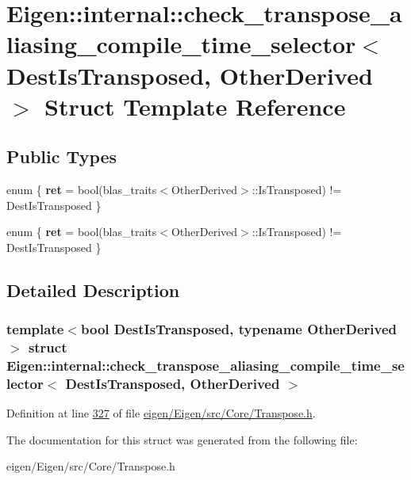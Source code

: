 \hypertarget{struct_eigen_1_1internal_1_1check__transpose__aliasing__compile__time__selector}{}\section{Eigen\+:\+:internal\+:\+:check\+\_\+transpose\+\_\+aliasing\+\_\+compile\+\_\+time\+\_\+selector$<$ Dest\+Is\+Transposed, Other\+Derived $>$ Struct Template Reference}
\label{struct_eigen_1_1internal_1_1check__transpose__aliasing__compile__time__selector}
\subsection*{Public Types}
\begin{DoxyCompactItemize}
\item 
\mbox{\label{struct_eigen_1_1internal_1_1check__transpose__aliasing__compile__time__selector_a2ebfc583e4b289fc4ffa23163162bf51}} 
enum \{ {\bfseries ret} = bool(blas\+\_\+traits$<$Other\+Derived$>$\+:\+:Is\+Transposed) != Dest\+Is\+Transposed
 \}
\item 
\mbox{\label{struct_eigen_1_1internal_1_1check__transpose__aliasing__compile__time__selector_ab4cc29d89225f610c0a24d8aa6ea722c}} 
enum \{ {\bfseries ret} = bool(blas\+\_\+traits$<$Other\+Derived$>$\+:\+:Is\+Transposed) != Dest\+Is\+Transposed
 \}
\end{DoxyCompactItemize}


\subsection{Detailed Description}
\subsubsection*{template$<$bool Dest\+Is\+Transposed, typename Other\+Derived$>$\newline
struct Eigen\+::internal\+::check\+\_\+transpose\+\_\+aliasing\+\_\+compile\+\_\+time\+\_\+selector$<$ Dest\+Is\+Transposed, Other\+Derived $>$}



Definition at line \hyperlink{eigen_2_eigen_2src_2_core_2_transpose_8h_source_l00327}{327} of file \hyperlink{eigen_2_eigen_2src_2_core_2_transpose_8h_source}{eigen/\+Eigen/src/\+Core/\+Transpose.\+h}.



The documentation for this struct was generated from the following file\+:\begin{DoxyCompactItemize}
\item 
eigen/\+Eigen/src/\+Core/\+Transpose.\+h\end{DoxyCompactItemize}
